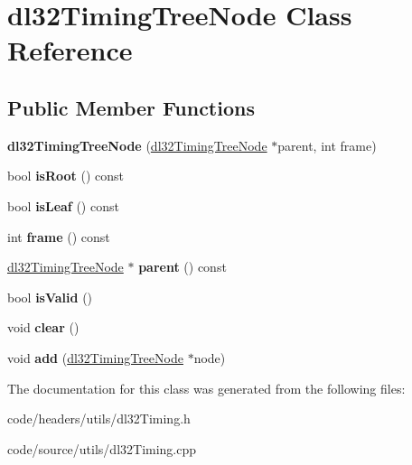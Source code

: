 \hypertarget{classdl32_timing_tree_node}{\section{dl32\-Timing\-Tree\-Node Class Reference}
\label{classdl32_timing_tree_node}
}
\subsection*{Public Member Functions}
\begin{DoxyCompactItemize}
\item 
\hypertarget{classdl32_timing_tree_node_adf856e115c83b7072dbdd2821ae0b167}{{\bfseries dl32\-Timing\-Tree\-Node} (\hyperlink{classdl32_timing_tree_node}{dl32\-Timing\-Tree\-Node} $\ast$parent, int frame)}\label{classdl32_timing_tree_node_adf856e115c83b7072dbdd2821ae0b167}

\item 
\hypertarget{classdl32_timing_tree_node_a7b7dd7614c85b8c5ef0603763a27d7df}{bool {\bfseries is\-Root} () const }\label{classdl32_timing_tree_node_a7b7dd7614c85b8c5ef0603763a27d7df}

\item 
\hypertarget{classdl32_timing_tree_node_ace3949352fb875bc0bbfbb9324ae5ce8}{bool {\bfseries is\-Leaf} () const }\label{classdl32_timing_tree_node_ace3949352fb875bc0bbfbb9324ae5ce8}

\item 
\hypertarget{classdl32_timing_tree_node_aaed4af59be99fb14a66b4385405e0f52}{int {\bfseries frame} () const }\label{classdl32_timing_tree_node_aaed4af59be99fb14a66b4385405e0f52}

\item 
\hypertarget{classdl32_timing_tree_node_aa164637785df6ce407872f7e372cd896}{\hyperlink{classdl32_timing_tree_node}{dl32\-Timing\-Tree\-Node} $\ast$ {\bfseries parent} () const }\label{classdl32_timing_tree_node_aa164637785df6ce407872f7e372cd896}

\item 
\hypertarget{classdl32_timing_tree_node_a0775af2b620ba5c5416a1a72e060a3fb}{bool {\bfseries is\-Valid} ()}\label{classdl32_timing_tree_node_a0775af2b620ba5c5416a1a72e060a3fb}

\item 
\hypertarget{classdl32_timing_tree_node_af53539167c29b8d85042894771efe087}{void {\bfseries clear} ()}\label{classdl32_timing_tree_node_af53539167c29b8d85042894771efe087}

\item 
\hypertarget{classdl32_timing_tree_node_a365100e1e14aece4f272ea4983cade20}{void {\bfseries add} (\hyperlink{classdl32_timing_tree_node}{dl32\-Timing\-Tree\-Node} $\ast$node)}\label{classdl32_timing_tree_node_a365100e1e14aece4f272ea4983cade20}

\end{DoxyCompactItemize}


The documentation for this class was generated from the following files\-:\begin{DoxyCompactItemize}
\item 
code/headers/utils/dl32\-Timing.\-h\item 
code/source/utils/dl32\-Timing.\-cpp\end{DoxyCompactItemize}
